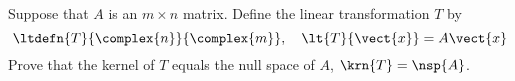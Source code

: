 Suppose that $A$ is an $m\times n$ matrix.  Define the linear transformation $T$ by
%
\begin{equation*}
\ltdefn{T}{\complex{n}}{\complex{m}},\quad \lt{T}{\vect{x}}=A\vect{x}
\end{equation*}
%
Prove that the kernel of $T$ equals the null space of $A$, $\krn{T}=\nsp{A}$. 